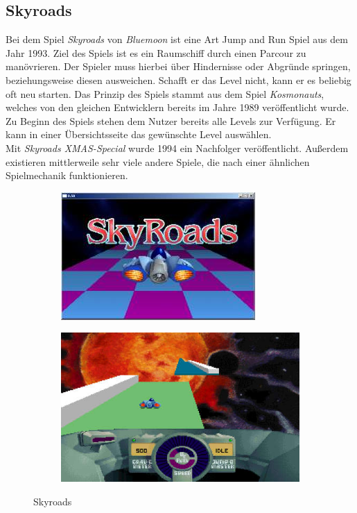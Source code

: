\subsection{Skyroads}
Bei dem Spiel \textit{Skyroads} von \textit{Bluemoon} ist eine Art Jump and Run Spiel aus dem Jahr 1993. Ziel des Spiels ist es ein Raumschiff durch einen Parcour zu manövrieren. Der Spieler muss hierbei über Hindernisse oder Abgründe springen, beziehungsweise diesen ausweichen. Schafft er das Level nicht, kann er es beliebig oft neu starten. Das Prinzip des Spiels stammt aus dem Spiel \textit{Kosmonauts}, welches von den gleichen Entwicklern bereits im Jahre 1989 veröffentlicht wurde. Zu Beginn des Spiels stehen dem Nutzer bereits alle Levels zur Verfügung. Er kann in einer Übersichtsseite das gewünschte Level auswählen. \\
Mit \textit{Skyroads XMAS-Special} wurde 1994 ein Nachfolger veröffentlicht. Außerdem existieren mittlerweile sehr viele andere Spiele, die nach einer ähnlichen Spielmechanik funktionieren.
\begin{figure}[ht]
	\centering
	\begin{subfigure}{6 cm}
	\centering
			\includegraphics{gfx/recherche/skyroads1.jpg}
	\end{subfigure}
	\begin{subfigure}{6 cm}
	\centering
			\includegraphics{gfx/recherche/skyroads2.jpg}  
	\end{subfigure}
	\caption{Skyroads}
\end{figure}\\


